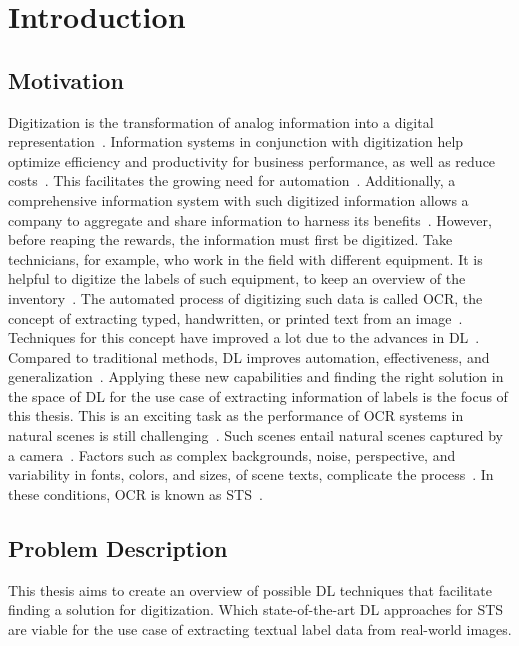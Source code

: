 \chapter{Introduction}\label{ch:intro}
\section{Motivation}
Digitization is the transformation of analog information into a digital
representation~\citep{imgrund_approaching_2018}.
Information systems in conjunction with digitization help optimize efficiency and productivity
for business performance, as well as reduce costs~\citep{imgrund_approaching_2018}.
This facilitates the growing need for automation~\citep{imgrund_approaching_2018}.
Additionally, a comprehensive information system with such digitized information allows a company
to aggregate and share information to harness its benefits~\citep{goodhue_impact_1992}.
However, before reaping the rewards, the information must first be digitized.
Take technicians, for example, who work in the field with different equipment.
It is helpful to digitize the labels of such equipment, to keep an overview of the
inventory~\citep{abramowicz_business_2019}.
The automated process of digitizing such data is called \ac{OCR}, the concept of extracting typed,
handwritten, or printed text from an image~\citep{zhao_improving_2020}.
Techniques for this concept have improved a lot due to the advances in
\ac{DL}~\citep{zhao_improving_2020}.
Compared to traditional methods, \ac{DL} improves automation, effectiveness, and
generalization~\citep{chen_text_2021}.
Applying these new capabilities and finding the right solution in the space of \ac{DL} for the
use case of extracting information of labels is the focus of this thesis.
This is an exciting task as the performance of \ac{OCR} systems in natural scenes is still
challenging~\citep{zhao_improving_2020, chen_text_2021}.
Such scenes entail natural scenes captured by a camera~\citep{chen_text_2021, baek_what_2019}.
Factors such as complex backgrounds, noise, perspective, and variability in fonts, colors, and sizes,
of scene texts, complicate the process~\citep{hu_gtc_2020,chen_text_2021,baek_what_2019}.
In these conditions, \ac{OCR} is known as \ac{STS}~\citep{long_scene_2021}.

\section{Problem Description}\label{se:problem}
This thesis aims to create an overview of possible \ac{DL} techniques that facilitate
finding a solution for digitization.
Which state-of-the-art \ac{DL} approaches for \ac{STS} are viable for the use case of extracting
textual label data from real-world images.

